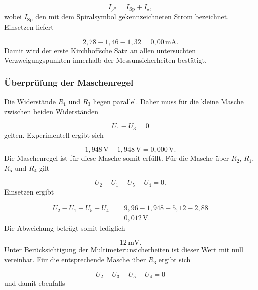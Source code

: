 \documentclass{report}
\begin{document}
\begin{equation}
I_{\nearrow}
=
I_{\mathrm{Sp}}
+
I_{\star},
\end{equation}
\noindent
wobei $I_{\mathrm{Sp}}$ den mit dem Spiralsymbol gekennzeichneten Strom
bezeichnet. Einsetzen liefert

\begin{equation}
2{,}78-1{,}46-1{,}32
=
0{,}00\,\mathrm{mA}.
\end{equation}
\noindent
Damit wird der erste Kirchhoffsche Satz an allen untersuchten
Verzweigungspunkten innerhalb der Messunsicherheiten bestätigt.


\subsubsection{Überprüfung der Maschenregel}
\noindent
Die Widerstände $R_1$ und $R_3$ liegen parallel. Daher muss für die kleine
Masche zwischen beiden Widerständen

\begin{equation}
U_1-U_3=0
\end{equation}
\noindent
gelten. Experimentell ergibt sich

\begin{equation}
1{,}948\,\mathrm{V}
-
1{,}948\,\mathrm{V}
=
0{,}000\,\mathrm{V}.
\end{equation}
\noindent
Die Maschenregel ist für diese Masche somit erfüllt.
\noindent
Für die Masche über $R_2$, $R_1$, $R_5$ und $R_4$ gilt

\begin{equation}
U_2-U_1-U_5-U_4=0.
\end{equation}
\noindent
Einsetzen ergibt

\begin{align}
U_2-U_1-U_5-U_4
&=
9{,}96
-
1{,}948
-
5{,}12
-
2{,}88\\
&=
0{,}012\,\mathrm{V}.
\end{align}
\noindent
Die Abweichung beträgt somit lediglich

\begin{equation}
12\,\mathrm{mV}.
\end{equation}
\noindent
Unter Berücksichtigung der Multimeterunsicherheiten ist dieser Wert mit null
vereinbar.
\noindent
Für die entsprechende Masche über $R_3$ ergibt sich

\begin{equation}
U_2-U_3-U_5-U_4=0
\end{equation}
\noindent
und damit ebenfalls
\end{document}
